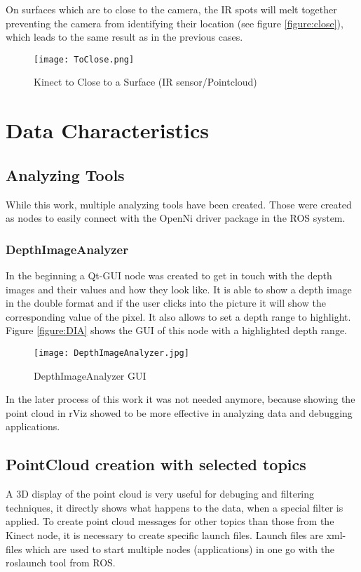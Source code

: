 On surfaces which are to close to the camera, the IR spots will melt together preventing the camera from
identifying their location (see figure \vref{figure:close}), which leads to the same result as in the previous cases.
\begin{figure}[htp]
\begin{center}
  \texttt{[image: ToClose.png]} 
  \caption{Kinect to Close to a Surface (IR sensor/Pointcloud)}
  \label{figure:close}
\end{center}
\end{figure}
\clearpage 
 
\section{Data Characteristics} 
 
\subsection{Analyzing Tools}

While this work, multiple analyzing tools have been created. Those were created as
nodes to easily connect with the OpenNi driver package in the ROS system.

\subsubsection{DepthImageAnalyzer}
In the beginning a Qt-GUI node was created to get in touch with the depth images and 
their values and how they look like. It is able to show a depth image in the double
format and if the user clicks into the picture it will show the corresponding 
value of the pixel. It also allows to set a depth range to highlight. 
Figure \vref{figure:DIA} shows the GUI of this node with a highlighted depth range.

\begin{figure}[h!tp]
\begin{center}
  \texttt{[image: DepthImageAnalyzer.jpg]}
  \caption{DepthImageAnalyzer GUI}
  \label{figure:DIA}
\end{center}
\end{figure}
\clearpage 


In the later process of this work it was not needed anymore, because showing the point cloud
in rViz showed to be more effective in analyzing data and debugging applications.

\subsection{PointCloud creation with selected topics}
A 3D display of the point cloud is very useful for debuging and filtering techniques, it directly shows what 
happens to the data, when a special filter is applied.
To create point cloud messages for other topics than those from the Kinect node, it is necessary to
create specific launch files. Launch files are xml-files which are used to start multiple nodes (applications) 
in one go with the roslaunch tool from ROS. 


